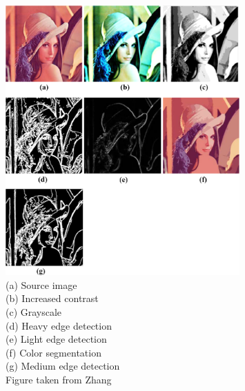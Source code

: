 \begin{figure}[p]
    \centering
    \includegraphics[width=0.8\textwidth]{diagrams/lena.png}
    \caption[Image filters]{(a) Source image\\(b) Increased contrast\\(c) Grayscale\\(d) Heavy edge detection\\
	(e) Light edge detection\\(f) Color segmentation\\(g) Medium edge detection\\Figure taken from Zhang\cite{filters}}
    \label{fig:lena}
\end{figure}